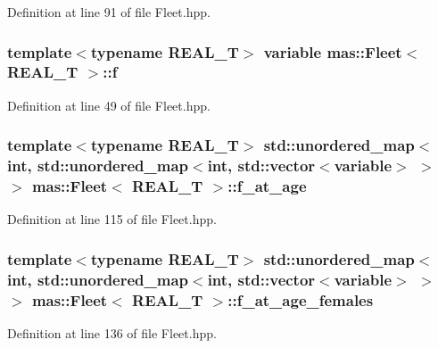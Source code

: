 Definition at line 91 of file Fleet.\-hpp.

\hypertarget{structmas_1_1_fleet_a940dd1929ae7d8efec755542a0462e45}{
\subsubsection[{f}]{\setlength{\rightskip}{0pt plus 5cm}template$<$typename R\-E\-A\-L\-\_\-\-T$>$ {\bf variable} {\bf mas\-::\-Fleet}$<$ R\-E\-A\-L\-\_\-\-T $>$\-::f}}\label{structmas_1_1_fleet_a940dd1929ae7d8efec755542a0462e45}


Definition at line 49 of file Fleet.\-hpp.

\hypertarget{structmas_1_1_fleet_a5a9769854c2272ced6396dc091b3e318}{
\subsubsection[{f\-\_\-at\-\_\-age}]{\setlength{\rightskip}{0pt plus 5cm}template$<$typename R\-E\-A\-L\-\_\-\-T$>$ std\-::unordered\-\_\-map$<$int, std\-::unordered\-\_\-map$<$int, std\-::vector$<${\bf variable}$>$ $>$ $>$ {\bf mas\-::\-Fleet}$<$ R\-E\-A\-L\-\_\-\-T $>$\-::f\-\_\-at\-\_\-age}}\label{structmas_1_1_fleet_a5a9769854c2272ced6396dc091b3e318}


Definition at line 115 of file Fleet.\-hpp.

\hypertarget{structmas_1_1_fleet_abbb7e39885ce82578a901e585d3c1526}{
\subsubsection[{f\-\_\-at\-\_\-age\-\_\-females}]{\setlength{\rightskip}{0pt plus 5cm}template$<$typename R\-E\-A\-L\-\_\-\-T$>$ std\-::unordered\-\_\-map$<$int, std\-::unordered\-\_\-map$<$int, std\-::vector$<${\bf variable}$>$ $>$ $>$ {\bf mas\-::\-Fleet}$<$ R\-E\-A\-L\-\_\-\-T $>$\-::f\-\_\-at\-\_\-age\-\_\-females}}\label{structmas_1_1_fleet_abbb7e39885ce82578a901e585d3c1526}


Definition at line 136 of file Fleet.\-hpp.

